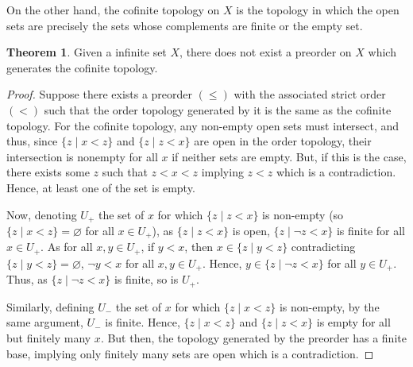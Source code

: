 \documentclass[]{article}
\theoremstyle{definition}
\newtheorem*{theorem*}{Theorem}
\theoremstyle{definition}
\begin{document}
On the other hand, the cofinite topology on \(X\) is the topology in which the open sets are precisely 
the sets whose complements are finite or the empty set.

\begin{theorem*}
  Given a infinite set \(X\), there does not exist a preorder on \(X\) which generates the cofinite topology.
\end{theorem*} 
\begin{proof}
  Suppose there exists a preorder \((\le)\) with the associated strict order \((<)\) such that the order topology generated by it is the same as the cofinite 
  topology. For the cofinite topology, any non-empty open sets must intersect, and thus, since \(\{z \mid x < z\}\) and 
  \(\{z \mid z < x\}\) are open in the order topology, their intersection is nonempty for all \(x\) if neither sets are empty. 
  But, if this is the case, there exists some \(z\) such that \(z < x < z\) implying \(z < z\) which is a contradiction. 
  Hence, at least one of the set is empty.
  
  Now, denoting \(U_+\) the set of \(x\) for which \(\{z \mid z < x\}\) is non-empty (so \(\{z \mid x < z\} = \varnothing\) for all \(x \in U_+\)), as 
  \(\{z \mid z < x\}\) is open, \(\{z \mid \neg z < x\}\) is finite for all \(x \in U_+\). As for all \(x, y \in U_+\), if \(y < x\), 
  then \(x \in \{z \mid y < z\}\) contradicting \(\{z \mid y < z\} = \varnothing\), \(\neg y < x\) for all \(x, y \in U_+\). Hence, 
  \(y \in \{z \mid \neg z < x\}\) for all \(y \in U_+\). Thus, as \(\{z \mid \neg z < x\}\) is finite, so is \(U_+\). 
  
  Similarly, defining \(U_-\) the set of \(x\) for which \(\{z \mid x < z\}\) is non-empty, by the same argument, \(U_-\) is finite. 
  Hence, \(\{z \mid x < z\}\) and \(\{z \mid z < x\}\) is empty for all but finitely many \(x\). But then, the topology generated by 
  the preorder has a finite base, implying only finitely many sets are open which is a contradiction.
\end{proof}
\end{document}
